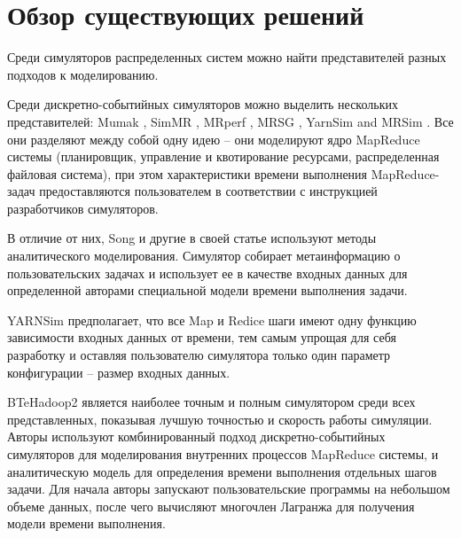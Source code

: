 \documentclass[../diploma.tex]{subfile}
\begin{document}
    
    \section{Обзор существующих решений}\label{sec:review}

    Среди симуляторов распределенных систем можно найти представителей разных
    подходов к моделированию. 

    Среди дискретно-событийных симуляторов можно выделить нескольких
    представителей: Mumak \cite{mumak}, SimMR \cite{simmr}, MRperf
    \cite{mrperf}, MRSG \cite{mrsg}, YarnSim \cite{yarnsim} and MRSim
    \cite{mrsim}. Все они разделяют между собой одну идею -- они моделируют ядро
    MapReduce системы (планировщик, управление и квотирование ресурсами,
    распределенная файловая система), при этом характеристики времени выполнения
    MapReduce-задач предоставляются пользователем в соответствии с инструкцией
    разработчиков симуляторов. 

    В отличие от них, Song и другие в своей статье \cite{song} используют методы
    аналитического моделирования. Симулятор собирает метаинформацию о
    пользовательских задачах и использует ее в качестве входных данных для
    определенной авторами специальной модели времени выполнения задачи. 
    
    YARNSim предполагает, что все Map и Redice шаги имеют одну функцию
    зависимости входных данных от времени, тем самым упрощая для себя разработку
    и оставляя пользователю симулятора только один параметр конфигурации --
    размер входных данных. 


    BTeHadoop2 \cite{baseline_model} является наиболее точным и полным
    симулятором среди всех представленных, показывая лучшую точностью и скорость
    работы симуляции. Авторы используют комбинированный подход
    дискретно-событийных симуляторов для моделирования внутренних процессов
    MapReduce системы, и аналитическую модель для определения времени выполнения
    отдельных шагов задачи. Для начала авторы запускают пользовательские
    программы на небольшом объеме данных, после чего вычисляют многочлен
    Лагранжа для получения модели времени выполнения.
\end{document}
